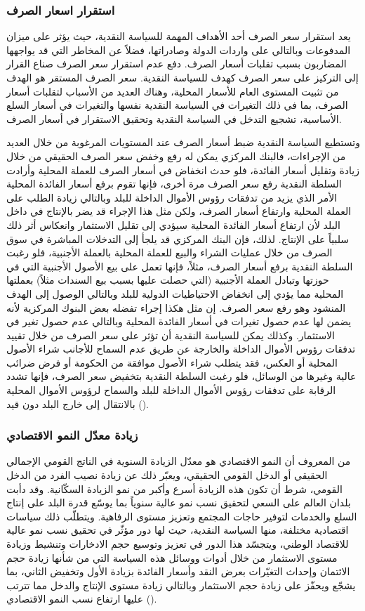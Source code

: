 \documentclass[10pt,a4paper]{report}
\begin{document}
\begin{doublespacing}
\subsubsection{استقرار اسعار الصرف}
يعد استقرار سعر الصرف أحد الأهداف المهمة للسياسة النقدية، حيث يؤثر على ميزان المدفوعات وبالتالي على واردات الدولة وصادراتها، فضلاً عن المخاطر التي قد يواجهها المضاربون بسبب تقلبات أسعار الصرف. دفع عدم استقرار سعر الصرف صناع القرار إلى التركيز على سعر الصرف كهدف للسياسة النقدية. سعر الصرف المستقر هو الهدف من تثبيت المستوى العام للأسعار المحلية، وهناك العديد من الأسباب لتقلبات أسعار الصرف، بما في ذلك التغيرات في السياسة النقدية نفسها والتغيرات في أسعار السلع الأساسية، تشجيع التدخل في السياسة النقدية وتحقيق الاستقرار في أسعار الصرف.

وتستطيع السياسة النقدية ضبط أسعار الصرف عند المستويات المرغوبة من خلال العديد من الإجراءات، فالبنك المركزي يمكن له رفع وخفض سعر الصرف الحقيقي من خلال زيادة وتقليل أسعار الفائدة، فلو حدث انخفاض في أسعار الصرف للعملة المحلية وأرادت السلطة النقدية رفع سعر الصرف مرة أخرى، فإنها تقوم برفع أسعار الفائدة المحلية الأمر الذي يزيد من تدفقات رؤوس الأموال الداخلة للبلد وبالتالي زيادة الطلب على العملة المحلية وارتفاع أسعار الصرف، ولكن مثل هذا الإجراء قد يضر بالإنتاج في داخل البلد لأن ارتفاع أسعار الفائدة المحلية سيؤدي إلى تقليل الاستثمار وانعكاس أثر ذلك سلبياً على الإنتاج. لذلك، فإن البنك المركزي قد يلجأ إلى التدخلات المباشرة في سوق الصرف من خلال عمليات الشراء والبيع للعملة المحلية بالعملة الأجنبية، فلو رغبت السلطة النقدية برفع أسعار الصرف، مثلاً، فإنها تعمل على بيع الأصول الأجنبية التي في حوزتها وتبادل العملة الأجنبية (التي حصلت عليها بسبب بيع السندات مثلاً) بعملتها المحلية مما يؤدي إلى انخفاض الاحتياطيات الدولية للبلد وبالتالي الوصول إلى الهدف المنشود وهو رفع سعر الصرف. إن مثل هكذا إجراء تفضله بعض البنوك المركزية لأنه يضمن لها عدم حصول تغيرات في أسعار الفائدة المحلية وبالتالي عدم حصول تغير في الاستثمار. وكذلك يمكن للسياسة النقدية أن تؤثر على سعر الصرف من خلال تقييد تدفقات رؤوس الأموال الداخلة والخارجة عن طريق عدم السماح للأجانب شراء الأصول المحلية أو العكس، فقد يتطلب شراء الأصول موافقة من الحكومة أو فرض ضرائب عالية وغيرها من الوسائل، فلو رغبت السلطة النقدية بتخفيض سعر الصرف، فإنها تشدد الرقابة على تدفقات رؤوس الأموال الداخلة للبلد والسماح لرؤوس الأموال المحلية بالانتقال إلى خارج البلد دون قيد ().
\subsubsection{زيادة معدّل النمو الاقتصادي}
من المعروف أن النمو الاقتصادي هو معدّل الزيادة السنوية في الناتج القومي الإجمالي الحقيقي أو الدخل القومي الحقيقي، ويعبّر ذلك عن زيادة نصيب الفرد من الدخل القومي، شرط أن تكون هذه الزيادة أسرع وأكبر من نمو الزيادة السكّانية. وقد دأبت بلدان العالم على السعي لتحقيق نسب نمو عالية سنوياً بما يوسّع قدرة البلد على إنتاج السلع والخدمات لتوفير حاجات المجتمع وتعزيز مستوى الرفاهية. ويتطلّب ذلك سياسات اقتصادية مختلفة، منها السياسة النقدية، حيث لها دور مؤثّر في تحقيق نسب نمو عالية للاقتصاد الوطني، ويتجسّد هذا الدور في تعزيز وتوسيع حجم الادخارات وتنشيط وزيادة مستوى الاستثمار من خلال أدوات ووسائل هذه السياسة التي من شأنها زيادة حجم الائتمان وإحداث التغيّرات بعرض النقد وأسعار الفائدة بزيادة الأول وتخفيض الثاني، بما يشجّع ويحفّز على زيادة حجم الاستثمار وبالتالي زيادة مستوى الإنتاج والدخل مما تترتب عليها ارتفاع نسب النمو الاقتصادي ().

\end{doublespacing}
\end{document}

